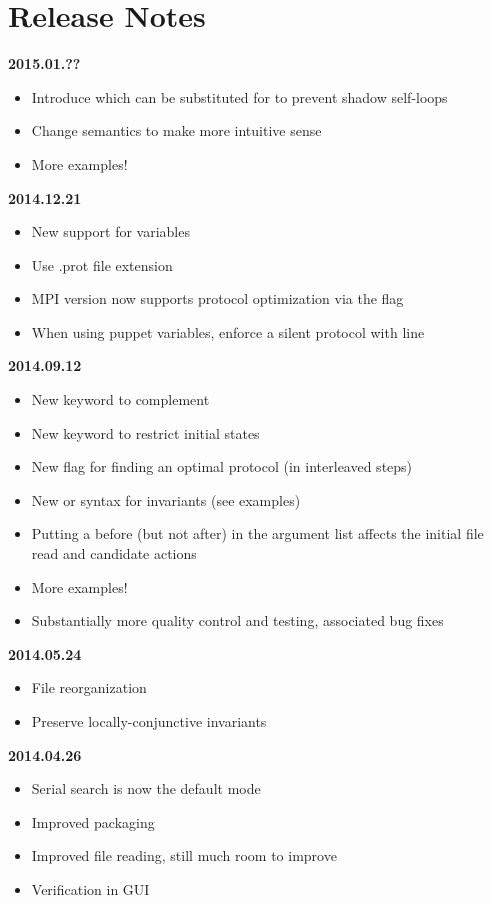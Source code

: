 
\section{Release Notes}

\textbf{2015.01.??}
\begin{itemize}
\item Introduce  which can be substituted for  to prevent shadow self-loops
\item Change  semantics to make more intuitive sense
\item More examples!
\end{itemize}
\textbf{2014.12.21}
\begin{itemize}
\item New support for  variables
\item Use .prot file extension
\item MPI version now supports protocol optimization via the  flag
\item When using puppet variables, enforce a silent protocol with  line
\end{itemize}
\textbf{2014.09.12}
\begin{itemize}
\item New  keyword to complement 
\item New  keyword to restrict initial states
\item New  flag for finding an optimal protocol (in interleaved steps)
\item New  or  syntax for invariants (see examples)
\item Putting a  before (but not after)  in the argument list affects the initial file read and candidate actions
\item More examples!
\item Substantially more quality control and testing, associated bug fixes
\end{itemize}
\textbf{2014.05.24}
\begin{itemize}
\item File reorganization
\item Preserve locally-conjunctive invariants
\end{itemize}
\textbf{2014.04.26}
\begin{itemize}
\item Serial search is now the default mode
\item Improved packaging
\item Improved file reading, still much room to improve
\item Verification in GUI
\end{itemize}
